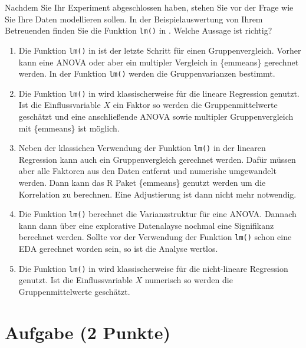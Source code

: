 \documentclass[a4paper, 9pt]{scrartcl}\usepackage[]{graphicx}\usepackage[]{xcolor}
\begin{document}
Nachdem Sie Ihr Experiment abgeschlossen haben, stehen Sie vor der Frage wie Sie Ihre Daten modellieren sollen. In der Beispielauswertung von Ihrem Betreuenden finden Sie die Funktion \texttt{lm()} in \Rlogo. Welche Aussage ist richtig?





\begin{enumerate}
\item [\textbf{A} \msquare] Die Funktion \texttt{lm()} in \Rlogo ist der letzte Schritt für einen Gruppenvergleich. Vorher kann eine ANOVA oder aber ein multipler Vergleich in \{emmeans\} gerechnet werden. In der Funktion  \texttt{lm()} werden die Gruppenvarianzen bestimmt.
\item [\textbf{B} \msquare] Die Funktion \texttt{lm()} in \Rlogo wird klassischerweise für die lineare Regression genutzt. Ist die Einflussvariable $X$ ein Faktor so werden die Gruppenmittelwerte geschätzt und eine anschließende ANOVA sowie multipler Gruppenvergleich mit \{emmeans\} ist möglich.
\item [\textbf{C} \msquare] Neben der klassichen Verwendung der Funktion \texttt{lm()} in der linearen Regression kann auch ein Gruppenvergleich gerechnet werden. Dafür müssen aber alle Faktoren aus den Daten entfernt und numerishc umgewandelt werden. Dann kann das R Paket \{emmeans\} genutzt werden um die Korrelation zu berechnen. Eine Adjustierung ist dann nicht mehr notwendig.
\item [\textbf{D} \msquare] Die Funktion \texttt{lm()} berechnet die Varianzstruktur für eine ANOVA. Dannach kann dann über eine explorative Datenalayse nochmal eine Signifikanz berechnet werden. Sollte vor der Verwendung der Funktion \texttt{lm()} schon eine EDA gerechnet worden sein, so ist die Analyse wertlos.
\item [\textbf{E} \msquare] Die Funktion \texttt{lm()} in \Rlogo wird klassischerweise für die nicht-lineare Regression genutzt. Ist die Einflussvariable $X$ numerisch so werden die Gruppenmittelwerte geschätzt.
\end{enumerate}

\section{Aufgabe \hfill (2 Punkte)}

\ifcollection
\begin{flushright}
\tiny\vspace{-2Ex}
\textbf{\examinhaltstart}
\exammodulebiostat
\vspace{-1Ex}
\end{flushright}
\fi
\end{document}
